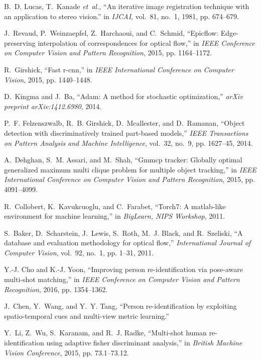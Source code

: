 \documentclass[journal]{IEEEtran}
\begin{document}
\begin{thebibliography}{10}
	B.~D. Lucas, T.~Kanade \emph{et~al.}, ``An iterative image registration
	technique with an application to stereo vision.'' in \emph{IJCAI}, vol.~81,
	no.~1, 1981, pp. 674--679.
	
	J.~Revaud, P.~Weinzaepfel, Z.~Harchaoui, and C.~Schmid, ``Epicflow:
	Edge-preserving interpolation of correspondences for optical flow,'' in
	\emph{IEEE Conference on Computer Vision and Pattern Recognition}, 2015, pp.
	1164--1172.
	
	R.~Girshick, ``Fast r-cnn,'' in \emph{IEEE International Conference on Computer
		Vision}, 2015, pp. 1440--1448.
	
	D.~Kingma and J.~Ba, ``Adam: A method for stochastic optimization,''
	\emph{arXiv preprint arXiv:1412.6980}, 2014.
	
	P.~F. Felzenszwalb, R.~B. Girshick, D.~Mcallester, and D.~Ramanan, ``Object
	detection with discriminatively trained part-based models,'' \emph{IEEE
		Transactions on Pattern Analysis and Machine Intelligence}, vol.~32, no.~9,
	pp. 1627--45, 2014.
	
	A.~Dehghan, S.~M. Assari, and M.~Shah, ``Gmmcp tracker: Globally optimal
	generalized maximum multi clique problem for multiple object tracking,'' in
	\emph{IEEE International Conference on Computer Vision and Pattern
		Recognition}, 2015, pp. 4091--4099.
	
	R.~Collobert, K.~Kavukcuoglu, and C.~Farabet, ``Torch7: A matlab-like
	environment for machine learning,'' in \emph{BigLearn, NIPS Workshop}, 2011.
	
	S.~Baker, D.~Scharstein, J.~Lewis, S.~Roth, M.~J. Black, and R.~Szeliski, ``A
	database and evaluation methodology for optical flow,'' \emph{International
		Journal of Computer Vision}, vol.~92, no.~1, pp. 1--31, 2011.
	
	Y.-J. Cho and K.-J. Yoon, ``Improving person re-identification via pose-aware
	multi-shot matching,'' in \emph{IEEE Conference on Computer Vision and
		Pattern Recognition}, 2016, pp. 1354--1362.
	
	J.~Chen, Y.~Wang, and Y.~Y. Tang, ``Person re-identification by exploiting
	spatio-temporal cues and multi-view metric learning.''
	
	Y.~Li, Z.~Wu, S.~Karanam, and R.~J. Radke, ``Multi-shot human re-identification
	using adaptive fisher discriminant analysis,'' in \emph{British Machine
		Vision Conference}, 2015, pp. 73.1--73.12.
	

\end{thebibliography}
\end{document}
